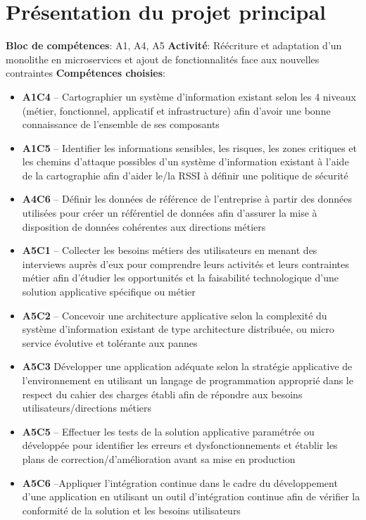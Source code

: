 \documentclass[a4paper, 11pt]{report}
\begin{document}
\section {Présentation du projet principal}
\textbf{Bloc de compétences}: A1, A4, A5
\newline
\textbf{Activité}: Réécriture et adaptation d’un monolithe en microservices et ajout de fonctionnalités face aux nouvelles contraintes
\newline
\textbf{Compétences choisies}: \begin{itemize}
  \item \textbf{A1C4} – Cartographier un système d’information existant selon les 4 niveaux (métier, fonctionnel, applicatif et infrastructure) afin d’avoir une bonne connaissance de l’ensemble de ses composants 
  \item \textbf{A1C5} – Identifier les informations sensibles, les risques, les zones critiques et les chemins d’attaque possibles d’un système d’information existant à l’aide de la cartographie afin d’aider le/la RSSI à définir une politique de sécurité
  \item \textbf{A4C6} – Définir les données de référence de l’entreprise à partir des données utilisées pour créer un référentiel de données afin d’assurer la mise à disposition de données cohérentes aux directions métiers
  \item \textbf{A5C1} – Collecter les besoins métiers des utilisateurs en menant des interviews auprès d’eux pour comprendre leurs activités et leurs contraintes métier afin d’étudier les opportunités et la faisabilité technologique d’une solution applicative spécifique ou métier
  \item \textbf{A5C2} – Concevoir une architecture applicative selon la complexité du système d’information existant de type architecture distribuée, ou micro service évolutive et tolérante aux pannes
  \item \textbf{A5C3} Développer une application adéquate selon la stratégie applicative de l’environnement en utilisant un langage de programmation approprié dans le respect du cahier des charges établi afin de répondre aux besoins utilisateurs/directions métiers
  \item \textbf{A5C5} – Effectuer les tests de la solution applicative paramétrée ou développée pour identifier les erreurs et dysfonctionnements et établir les plans de correction/d’amélioration avant sa mise en production
  \item \textbf{A5C6} –Appliquer l’intégration continue dans le cadre du développement d’une application en utilisant un outil d’intégration continue afin de vérifier la conformité de la solution et les besoins utilisateurs

\end{itemize}
\end{document}
